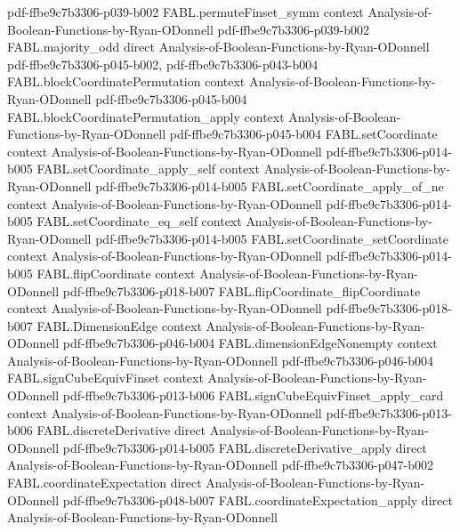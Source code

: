 \begin{theorem}
  {pdf-ffbe9c7b3306-p039-b002}
\proofstep
  {FABL.permuteFinset_symm}
  {context}
  {Analysis-of-Boolean-Functions-by-Ryan-ODonnell}
  {pdf-ffbe9c7b3306-p039-b002}
\proofstep
  {FABL.majority_odd}
  {direct}
  {Analysis-of-Boolean-Functions-by-Ryan-ODonnell}
  {pdf-ffbe9c7b3306-p045-b002,
    pdf-ffbe9c7b3306-p043-b004}
\proofstep
  {FABL.blockCoordinatePermutation}
  {context}
  {Analysis-of-Boolean-Functions-by-Ryan-ODonnell}
  {pdf-ffbe9c7b3306-p045-b004}
\proofstep
  {FABL.blockCoordinatePermutation_apply}
  {context}
  {Analysis-of-Boolean-Functions-by-Ryan-ODonnell}
  {pdf-ffbe9c7b3306-p045-b004}
\proofstep
  {FABL.setCoordinate}
  {context}
  {Analysis-of-Boolean-Functions-by-Ryan-ODonnell}
  {pdf-ffbe9c7b3306-p014-b005}
\proofstep
  {FABL.setCoordinate_apply_self}
  {context}
  {Analysis-of-Boolean-Functions-by-Ryan-ODonnell}
  {pdf-ffbe9c7b3306-p014-b005}
\proofstep
  {FABL.setCoordinate_apply_of_ne}
  {context}
  {Analysis-of-Boolean-Functions-by-Ryan-ODonnell}
  {pdf-ffbe9c7b3306-p014-b005}
\proofstep
  {FABL.setCoordinate_eq_self}
  {context}
  {Analysis-of-Boolean-Functions-by-Ryan-ODonnell}
  {pdf-ffbe9c7b3306-p014-b005}
\proofstep
  {FABL.setCoordinate_setCoordinate}
  {context}
  {Analysis-of-Boolean-Functions-by-Ryan-ODonnell}
  {pdf-ffbe9c7b3306-p014-b005}
\proofstep
  {FABL.flipCoordinate}
  {context}
  {Analysis-of-Boolean-Functions-by-Ryan-ODonnell}
  {pdf-ffbe9c7b3306-p018-b007}
\proofstep
  {FABL.flipCoordinate_flipCoordinate}
  {context}
  {Analysis-of-Boolean-Functions-by-Ryan-ODonnell}
  {pdf-ffbe9c7b3306-p018-b007}
\proofstep
  {FABL.DimensionEdge}
  {context}
  {Analysis-of-Boolean-Functions-by-Ryan-ODonnell}
  {pdf-ffbe9c7b3306-p046-b004}
\proofstep
  {FABL.dimensionEdgeNonempty}
  {context}
  {Analysis-of-Boolean-Functions-by-Ryan-ODonnell}
  {pdf-ffbe9c7b3306-p046-b004}
\proofstep
  {FABL.signCubeEquivFinset}
  {context}
  {Analysis-of-Boolean-Functions-by-Ryan-ODonnell}
  {pdf-ffbe9c7b3306-p013-b006}
\proofstep
  {FABL.signCubeEquivFinset_apply_card}
  {context}
  {Analysis-of-Boolean-Functions-by-Ryan-ODonnell}
  {pdf-ffbe9c7b3306-p013-b006}
\proofstep
  {FABL.discreteDerivative}
  {direct}
  {Analysis-of-Boolean-Functions-by-Ryan-ODonnell}
  {pdf-ffbe9c7b3306-p014-b005}
\proofstep
  {FABL.discreteDerivative_apply}
  {direct}
  {Analysis-of-Boolean-Functions-by-Ryan-ODonnell}
  {pdf-ffbe9c7b3306-p047-b002}
\proofstep
  {FABL.coordinateExpectation}
  {direct}
  {Analysis-of-Boolean-Functions-by-Ryan-ODonnell}
  {pdf-ffbe9c7b3306-p048-b007}
\proofstep
  {FABL.coordinateExpectation_apply}
  {direct}
  {Analysis-of-Boolean-Functions-by-Ryan-ODonnell}

\end{theorem}

